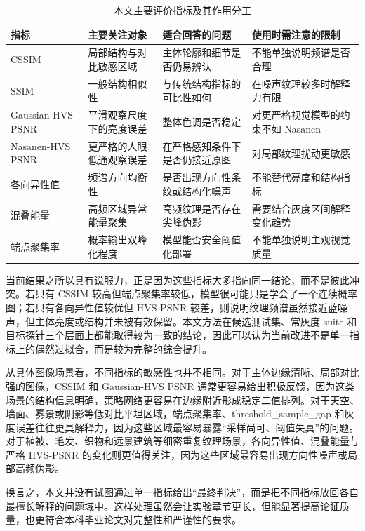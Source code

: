 \documentclass[thesis]{../zstucs-graduation-project}
\begin{document}
\begin{table}[H]
    \centering
    \small
    \caption{本文主要评价指标及其作用分工}
    \label{tab:5-4}
    \begin{tabularx}{0.98\textwidth}{>{\raggedright\arraybackslash}p{}YYY}
        \toprule
        指标 & 主要关注对象 & 适合回答的问题 & 使用时需注意的限制 \\
        \midrule
        CSSIM & 局部结构与对比敏感区域 & 主体轮廓和细节是否仍易辨认 & 不能单独说明频谱是否合理 \\
        SSIM & 一般结构相似性 & 与传统结构指标的可比性如何 & 在噪声纹理较多时解释力有限 \\
        Gaussian-HVS PSNR & 平滑观察尺度下的亮度误差 & 整体色调是否稳定 & 对更严格视觉模型的约束不如 Nasanen \\
        Nasanen-HVS PSNR & 更严格的人眼低通观察误差 & 在严格感知条件下是否仍接近原图 & 对局部纹理扰动更敏感 \\
        各向异性值 & 频谱方向均衡性 & 是否出现方向性条纹或结构化噪声 & 不能替代亮度和结构指标 \\
        混叠能量 & 高频区域异常能量聚集 & 高频纹理是否存在尖峰伪影 & 需要结合灰度区间解释变化趋势 \\
        端点聚集率 & 概率输出双峰化程度 & 模型能否安全阈值化部署 & 不能单独说明主观视觉质量 \\
        \bottomrule
    \end{tabularx}
\end{table}

当前结果之所以具有说服力，正是因为这些指标大多指向同一结论，而不是彼此冲突。若只有 CSSIM 较高但端点聚集率较低，模型很可能只是学会了一个连续概率图；若只有各向异性值较优但 HVS-PSNR 较差，则说明纹理频谱虽然接近蓝噪声，但主体亮度或结构并未被有效保留。本文方法在候选测试集、常灰度 suite 和目标探针三个层面上都能取得较为一致的结论，因此可以认为当前改进不是单一指标上的偶然过拟合，而是较为完整的综合提升。

从具体图像场景看，不同指标的敏感性也并不相同。对于主体边缘清晰、局部对比强的图像，CSSIM 和 Gaussian-HVS PSNR 通常更容易给出积极反馈，因为这类场景的结构信息明确，策略网络更容易在边缘附近形成稳定二值排列。对于天空、墙面、雾景或阴影等低对比平坦区域，端点聚集率、threshold\_sample\_gap 和灰度误差往往更具解释力，因为这些区域最容易暴露“采样尚可、阈值失真”的问题。对于植被、毛发、织物和远景建筑等细密重复纹理场景，各向异性值、混叠能量与严格 HVS-PSNR 的变化则更值得关注，因为这些区域最容易出现方向性噪声或局部高频伪影。

换言之，本文并没有试图通过单一指标给出“最终判决”，而是把不同指标放回各自最擅长解释的问题域中。这样处理虽然会让实验章节更长，但能显著提高论证质量，也更符合本科毕业论文对完整性和严谨性的要求。
\end{document}
